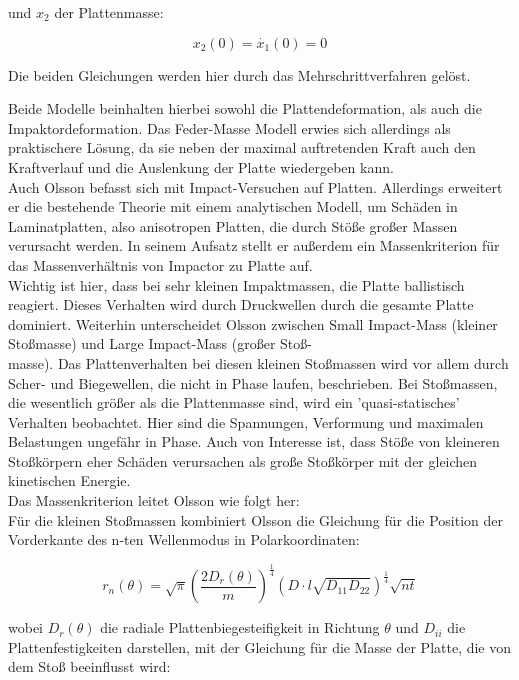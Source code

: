 und $x_{2}$ der Plattenmasse:

\begin{equation}
	x_{2}(0)=\dot{x_{1}}(0)=0
\end{equation}

Die beiden Gleichungen werden hier durch das Mehrschrittverfahren gelöst. 

Beide Modelle beinhalten hierbei sowohl die Plattendeformation, als auch die Impaktordeformation. Das Feder-Masse Modell erwies sich allerdings als praktischere Lösung, da sie neben der maximal auftretenden Kraft auch den Kraftverlauf und die Auslenkung der Platte wiedergeben kann. \\
Auch Olsson \cite{Olsson.2000} befasst sich mit Impact-Versuchen auf Platten. Allerdings erweitert er die bestehende Theorie mit einem analytischen Modell, um Schäden in Laminatplatten, also anisotropen Platten, die durch Stöße großer Massen verursacht werden. In seinem Aufsatz stellt er außerdem ein Massenkriterion für das Massenverhältnis von Impactor zu Platte auf.\\
Wichtig ist hier, dass bei sehr kleinen Impaktmassen, die Platte ballistisch reagiert. Dieses Verhalten wird durch Druckwellen durch die gesamte Platte dominiert. Weiterhin unterscheidet Olsson zwischen Small Impact-Mass (kleiner Stoßmasse) und Large Impact-Mass (großer Stoß-\\masse). Das Plattenverhalten bei diesen kleinen Stoßmassen wird vor allem durch Scher- und Biegewellen, die nicht in Phase laufen, beschrieben. Bei Stoßmassen, die wesentlich größer als die Plattenmasse sind, wird ein 'quasi-statisches' Verhalten beobachtet. Hier sind die Spannungen, Verformung und maximalen Belastungen ungefähr in Phase. Auch von Interesse ist, dass Stöße von kleineren Stoßkörpern eher Schäden verursachen als große Stoßkörper mit der gleichen kinetischen Energie.\\
Das Massenkriterion leitet Olsson wie folgt her:\\
Für die kleinen Stoßmassen kombiniert Olsson die Gleichung für die Position der Vorderkante des n-ten Wellenmodus in Polarkoordinaten:

\begin{equation}
	r_{n}(\theta) = \sqrt{\pi}(\frac{2D_{r}(\theta)}{m})^{\frac{1}{4}} (D \cdot l\sqrt{D_{11}D_{22}})^{\frac{1}{4}}\sqrt{nt}
\end{equation}

wobei $D_{r}(\theta)$ die radiale Plattenbiegesteifigkeit in Richtung $\theta$ und $D_{ii}$ die Plattenfestigkeiten darstellen, mit der Gleichung für die Masse der Platte, die von dem Stoß beeinflusst wird:

